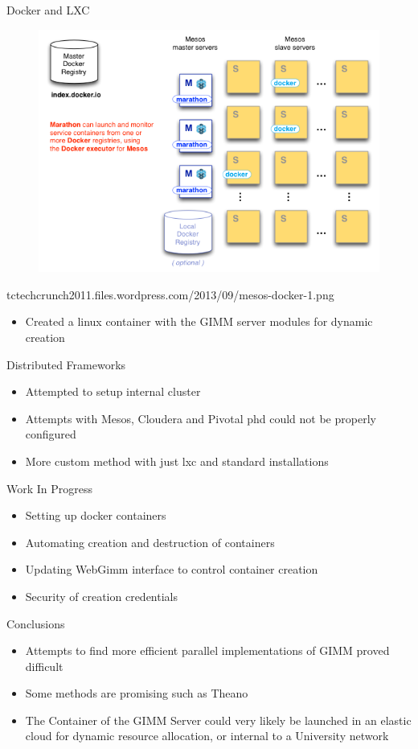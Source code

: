 \documentclass{beamer}
\begin{document}
 \begin{frame}{Docker and LXC}
    \begin{figure}
  \centering \includegraphics[scale=.30]{doc/mesos}
  \end{figure}
  tctechcrunch2011.files.wordpress.com/2013/09/mesos-docker-1.png
  \begin{itemize}
   \item Created a linux container with the GIMM server modules for dynamic creation
  \end{itemize}
 \end{frame}
 
  \begin{frame}{Distributed Frameworks}
  \begin{itemize}
    \item Attempted to setup internal cluster
    \item Attempts with Mesos, Cloudera and Pivotal phd could not be properly configured
    \item More custom method with just lxc and standard installations
    \end{itemize}
  \end{frame}
   \begin{frame}{Work In Progress}
  \begin{itemize}
   \item Setting up docker containers
   \item Automating creation and destruction of containers
   \item Updating WebGimm interface to control container creation
   \item Security of creation credentials 
  \end{itemize}
  \end{frame}
 \begin{frame}{Conclusions}
  \begin{itemize}
   \item Attempts to find more efficient parallel implementations of GIMM proved difficult
   \item Some methods are promising such as Theano
   \item The Container of the GIMM Server could very likely be launched in an elastic cloud for dynamic resource allocation, or internal to a University network
  \end{itemize}
 \end{frame}
 
\end{document}
